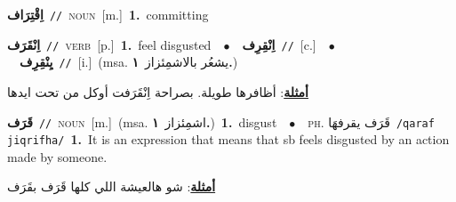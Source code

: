 \documentclass[10pt,a4paper,twoside]{article} %
\begin{document}
\begin{multicols}{2}
{\setlength\topsep{0pt}\textbf{\foreignlanguage{arabic}{اِقْتِرَاف}}\ {\color{gray}\texttt{//}\color{black}}\ \textsc{noun}\ [m.]\ \textbf{1.}~committing\ } \vspace{2mm}

{\setlength\topsep{0pt}\textbf{\foreignlanguage{arabic}{اِنْقَرَف}}\ {\color{gray}\texttt{//}\color{black}}\ \textsc{verb}\ [p.]\ \textbf{1.}~feel disgusted\ \ $\bullet$\ \ \setlength\topsep{0pt}\textbf{\foreignlanguage{arabic}{اِنْقِرِف}}\ {\color{gray}\texttt{//}\color{black}}\ [c.]\ \ $\bullet$\ \ \setlength\topsep{0pt}\textbf{\foreignlanguage{arabic}{يِنْقِرِف}}\ {\color{gray}\texttt{//}\color{black}}\ [i.]\ \color{gray}(msa. \foreignlanguage{arabic}{يشعُر بالاشمِئزاز}~\foreignlanguage{arabic}{\textbf{١.}})\color{black}\  \begin{flushright}\color{gray}\foreignlanguage{arabic}{\textbf{\underline{\foreignlanguage{arabic}{أمثلة}}}: أظافرها طويلة. بصراحة اِنْقَرَفت أوكل من تحت ايدها}\end{flushright}\color{black}} \vspace{2mm}

{\setlength\topsep{0pt}\textbf{\foreignlanguage{arabic}{قَرَف}}\ {\color{gray}\texttt{//}\color{black}}\ \textsc{noun}\ [m.]\ \color{gray}(msa. \foreignlanguage{arabic}{اشمِئزاز}~\foreignlanguage{arabic}{\textbf{١.}})\color{black}\ \textbf{1.}~disgust\ \ $\bullet$\ \ \textsc{ph.} \color{gray} \foreignlanguage{arabic}{قَرَف يقرفهَا}\color{black}\ {\color{gray}\texttt{/{\sffamily qaraf jiqrifha}/}\color{black}}\ \textbf{1.}~It is an expression that means that sb feels disgusted by an action made by someone.\  \begin{flushright}\color{gray}\foreignlanguage{arabic}{\textbf{\underline{\foreignlanguage{arabic}{أمثلة}}}: شو هالعيشة اللي كلها قَرَف بقَرَف}\end{flushright}\color{black}} \vspace{2mm}


\end{multicols}
\end{document}
